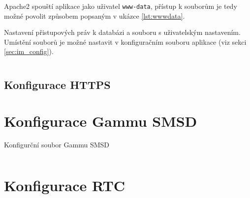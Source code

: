 Apache2 spouští aplikace jako uživatel \texttt{www-data}, přístup k souborům je tedy možné povolit způsobem popsaným v ukázce \ref{lst:wwwdata}.

\begin{listing}[htbp]
\caption{\label{lst:wwwdata} Nastavení přistupových práv k databázi a souboru s uživatelským nastavením. Umístění souborů je možné nastavit v konfiguračním souboru aplikace (viz sekci \ref{sec:im_config}).}
\inputminted[bgcolor=codebg]{bash}{source-samples/wwwdata.sh}
\end{listing}

\subsection{Konfigurace HTTPS}


\section{Konfigurace Gammu SMSD}

\begin{listing}[htbp]
\caption{\label{lst:gammurc} Konfigurční soubor Gammu SMSD}
\inputminted[bgcolor=codebg]{ini}{source-samples/gammurc}
\end{listing}

\section{Konfigurace RTC}